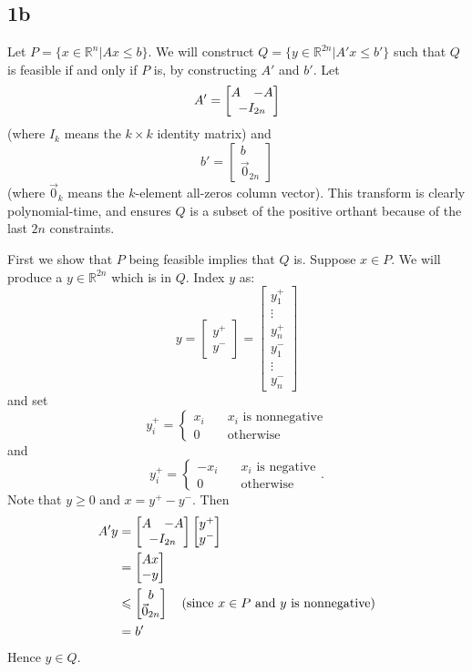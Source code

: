 \documentclass{article}
\begin{document}
\subsection*{1b}
Let $P = \{x \in \mathbb{R}^n | Ax \leqslant b\}$. We will construct $Q = \{y \in \mathbb{R}^{2n} | A'x \leqslant b'\} $ such that $Q$ is feasible if and only if $P$ is, by constructing $A'$ and $b'$. Let
\[ A' = \begin{bmatrix} A & -A \\ \multicolumn{2}{c}{-I_{2n}} \end{bmatrix}\]
(where $I_k$ means the $k \times k$ identity matrix) and
\[ b' = \begin{bmatrix} b \\ \vec0_{2n} \end{bmatrix} \] 
(where $\vec 0_k$ means the $k$-element all-zeros column vector). This transform is clearly polynomial-time, and ensures $Q$ is a subset of the positive orthant because of the last $2n$ constraints.

First we show that $P$ being feasible implies that $Q$ is. Suppose $x \in P$. We will produce a $y\in \mathbb{R}^{2n}$ which is in $Q$. Index $y$ as:
\[ y = \begin{bmatrix} y^+ \\ y^- \end{bmatrix} = \begin{bmatrix} y^+_1 \\ \vdots \\ y^+_n \\ y^-_1 \\ \vdots \\ y^-_n \end{bmatrix}\]
and set
\[y^+_i = \begin{cases} x_i & \quad \text {$x_i$ is nonnegative} \\ 0 & \quad \text {otherwise} \end{cases}\]
and
\[y^+_i = \begin{cases} -x_i & \quad \text {$x_i$ is negative} \\ 0 & \quad \text {otherwise} \end{cases}.\]
Note that $y \geqslant 0$ and $x = y^+ - y^-$. Then
\begin{align*}
A'y &= \begin{bmatrix} A & -A \\ \multicolumn{2}{c}{-I_{2n}} \end{bmatrix} \begin{bmatrix} y^+ \\ y^- \end{bmatrix} \\
&= \begin{bmatrix} Ax \\ -y \end{bmatrix} \\
&\leqslant \begin{bmatrix} b \\ \vec{0}_{2n} \end{bmatrix} \quad \text {(since $x \in P$ and $y$ is nonnegative)}\\
&= b'
\end{align*}
Hence $y \in Q$.
\end{document}
